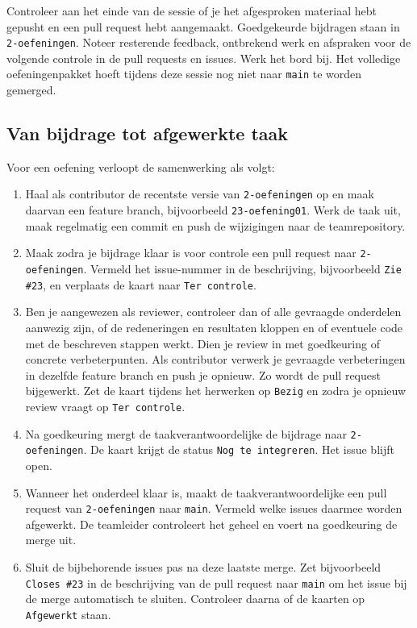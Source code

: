 \documentclass[kulak]{kulakarticle} %
\begin{document}
Controleer aan het einde van de sessie of je het afgesproken materiaal hebt
gepusht en een pull request hebt aangemaakt. Goedgekeurde bijdragen staan
in \texttt{2-oefeningen}. Noteer resterende feedback, ontbrekend werk en
afspraken voor de volgende controle in de pull requests en issues. Werk
het bord bij. Het volledige oefeningenpakket hoeft tijdens deze sessie
nog niet naar \texttt{main} te worden gemerged.

\subsection{Van bijdrage tot afgewerkte taak}

Voor een oefening verloopt de samenwerking als volgt:
\begin{enumerate}
    \item Haal als contributor de recentste versie van \texttt{2-oefeningen}
    op en maak daarvan een feature branch, bijvoorbeeld
    \texttt{23-oefening01}. Werk de taak uit, maak regelmatig een commit en
    push de wijzigingen naar de teamrepository.
    \item Maak zodra je bijdrage klaar is voor controle een pull request
    naar \texttt{2-oefeningen}. Vermeld het issue-nummer
    in de beschrijving, bijvoorbeeld \texttt{Zie \#23}, en verplaats de
    kaart naar \texttt{Ter controle}.
    \item Ben je aangewezen als reviewer, controleer dan of alle gevraagde
    onderdelen aanwezig zijn, of de redeneringen en resultaten kloppen en
    of eventuele code met de beschreven stappen werkt. Dien je review in
    met goedkeuring of concrete verbeterpunten. Als contributor verwerk je
    gevraagde verbeteringen in dezelfde feature branch en push je opnieuw.
    Zo wordt de pull request bijgewerkt. Zet de kaart tijdens het herwerken
    op \texttt{Bezig} en zodra je opnieuw review vraagt op
    \texttt{Ter controle}.
    \item Na goedkeuring mergt de taakverantwoordelijke de bijdrage naar
    \texttt{2-oefeningen}. De kaart krijgt de status
    \texttt{Nog te integreren}. Het issue blijft open.
    \item Wanneer het onderdeel klaar is, maakt de taakverantwoordelijke
    een pull request van \texttt{2-oefeningen} naar \texttt{main}.
    Vermeld welke issues daarmee worden afgewerkt. De teamleider controleert
    het geheel en voert na goedkeuring de merge uit.
    \item Sluit de bijbehorende issues pas na deze laatste merge. Zet
    bijvoorbeeld \texttt{Closes \#23} in de beschrijving van de pull request
    naar \texttt{main} om het issue bij de merge automatisch te sluiten.
    Controleer daarna of de kaarten op \texttt{Afgewerkt} staan.
\end{enumerate}
\end{document}
